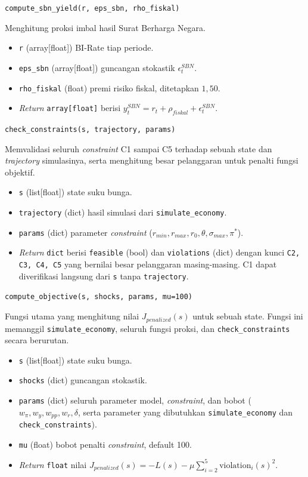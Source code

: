 \texttt{compute\_sbn\_yield(r, eps\_sbn, rho\_fiskal)}

Menghitung proksi imbal hasil Surat Berharga Negara.

\begin{itemize}
    \item \texttt{r} (array[float]) BI-Rate tiap periode.
    \item \texttt{eps\_sbn} (array[float]) guncangan stokastik $\epsilon_t^{SBN}$.
    \item \texttt{rho\_fiskal} (float) premi risiko fiskal, ditetapkan $1{,}50$.
    \item \textit{Return} \texttt{array[float]} berisi $y_t^{SBN} = r_t + \rho_{fiskal} + \epsilon_t^{SBN}$.
\end{itemize}

\texttt{check\_constraints(s, trajectory, params)}

Memvalidasi seluruh \textit{constraint} C1 sampai C5 terhadap sebuah state dan \textit{trajectory} simulasinya, serta menghitung besar pelanggaran untuk penalti fungsi objektif.

\begin{itemize}
    \item \texttt{s} (list[float]) state suku bunga.
    \item \texttt{trajectory} (dict) hasil simulasi dari \texttt{simulate\_economy}.
    \item \texttt{params} (dict) parameter \textit{constraint} ($r_{min}, r_{max}, r_0, \theta, \sigma_{max}, \pi^{*}$).
    \item \textit{Return} \texttt{dict} berisi \texttt{feasible} (bool) dan \texttt{violations} (dict) dengan kunci \texttt{C2, C3, C4, C5} yang bernilai besar pelanggaran masing-masing. C1 dapat diverifikasi langsung dari \texttt{s} tanpa \texttt{trajectory}.
\end{itemize}

\texttt{compute\_objective(s, shocks, params, mu=100)}

Fungsi utama yang menghitung nilai $J_{penalized}(s)$ untuk sebuah state. Fungsi ini memanggil \texttt{simulate\_economy}, seluruh fungsi proksi, dan \texttt{check\_constraints} secara berurutan.

\begin{itemize}
    \item \texttt{s} (list[float]) state suku bunga.
    \item \texttt{shocks} (dict) guncangan stokastik.
    \item \texttt{params} (dict) seluruh parameter model, \textit{constraint}, dan bobot ($w_\pi, w_y, w_{pp}, w_r, \delta$, serta parameter yang dibutuhkan \texttt{simulate\_economy} dan \texttt{check\_constraints}).
    \item \texttt{mu} (float) bobot penalti \textit{constraint}, default 100.
    \item \textit{Return} \texttt{float} nilai $J_{penalized}(s) = -L(s) - \mu \sum_{i=2}^{5} \text{violation}_i(s)^2$.
\end{itemize}

